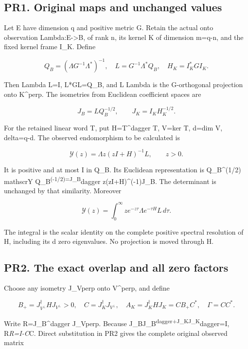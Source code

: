 \documentclass[11pt]{article}
\begin{document}
\subsection{PR1. Original maps and unchanged values}\label{pr1.-original-maps-and-unchanged-values}

Let E have dimension q and positive metric G. Retain the actual onto observation Lambda:E-\textgreater B, of rank n, its kernel K of dimension m=q-n, and the fixed kernel frame I\_K. Define

\[
Q_B=(\Lambda G^{-1}\Lambda^*)^{-1},\quad
L=G^{-1}\Lambda^*Q_B,\quad
H_K=I_K^*GI_K.
\tag{PR1}
\]

Then Lambda L=I, L*GL=Q\_B, and L Lambda is the G-orthogonal projection onto K\^{}perp. The isometries from Euclidean coefficient spaces are

\[
J_B=LQ_B^{-1/2},\qquad J_K=I_KH_K^{-1/2}.
\]

For the retained linear word T, put H=T\^{}dagger T, V=ker T, d=dim V, delta=q-d. The observed endomorphism to be calculated is

\[
\mathscr Y(z)=\Lambda z(zI+H)^{-1}L,\qquad z>0.
\tag{PR2}
\]

It is positive and at most I in Q\_B. Its Euclidean representation is Q\_B\^{}(1/2) mathscrY Q\_B\textsuperscript{(-1/2)=J\_B}dagger z(zI+H)\^{}(-1)J\_B. The determinant is unchanged by that similarity. Moreover

\[
\mathscr Y(z)=\int_0^\infty z e^{-z\tau}
\Lambda e^{-\tau H}L\,d\tau.
\tag{PR3}
\]

The integral is the scalar identity on the complete positive spectral resolution of H, including its d zero eigenvalues. No projection is moved through H.

\subsection{PR2. The exact overlap and all zero factors}\label{pr2.-the-exact-overlap-and-all-zero-factors}

Choose any isometry J\_Vperp onto V\^{}perp, and define

\[
B_+=J_{V^\perp}^\dagger HJ_{V^\perp}>0,\quad
C=J_K^\dagger J_{V^\perp},\quad
A_K=J_K^\dagger HJ_K=CB_+C^*,\quad \Gamma=CC^*.
\tag{PR4}
\]

Write R=J\_B\^{}dagger J\_Vperp. Because J\_BJ\_B\textsuperscript{dagger+J\_KJ\_K}dagger=I, R\emph{R=I-C}C. Direct substitution in PR2 gives the complete original observed matrix
\end{document}
